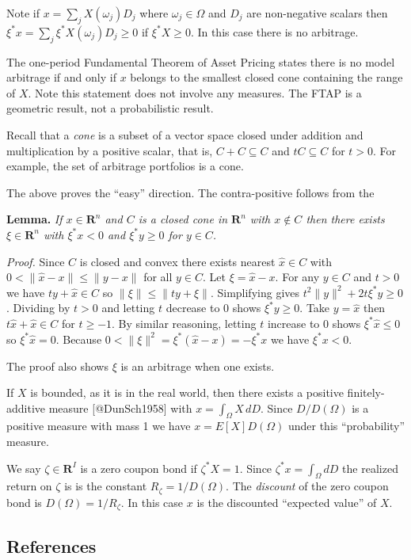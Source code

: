 Note if \(x = \sum_j X(\omega_j) D_j\) where \(\omega_j\in\Omega\) and
\(D_j\) are non-negative scalars then
\({\xi^*x = \sum_j \xi^*X(\omega_j) D_j \ge 0}\) if \(\xi^*X\ge0\). In
this case there is no arbitrage.

The one-period Fundamental Theorem of Asset Pricing states there is no
model arbitrage if and only if \(x\) belongs to the smallest closed cone
containing the range of \(X\). Note this statement does not involve any
measures. The FTAP is a geometric result, not a probabilistic result.

Recall that a \emph{cone} is a subset of a vector space closed under
addition and multiplication by a positive scalar, that is,
\(C + C\subseteq C\) and \(tC\subseteq C\) for \(t > 0\). For example,
the set of arbitrage portfolios is a cone.

The above proves the ``easy'' direction. The contra-positive follows
from the

\textbf{Lemma.} \emph{If \(x\in\mathbf{R}^n\) and \(C\) is a closed cone
in \(\mathbf{R}^n\) with \(x\not\in C\) then there exists
\(\xi\in\mathbf{R}^n\) with \(\xi^* x < 0\) and \(\xi^* y \ge0\) for
\(y\in C\).}

\emph{Proof.} Since \(C\) is closed and convex there exists nearest
\(\hat{x}\in C\) with \(0 < \|\hat{x} - x\| \le \|y - x\|\) for all
\(y\in C\). Let \(\xi = \hat{x} - x\). For any \(y\in C\) and \(t > 0\)
we have \(ty + \hat{x}\in C\) so \(\|\xi\| \le \|ty + \xi\|\).
Simplifying gives \(t^2\|y\|^2 + 2t\xi^* y\ge 0\). Dividing by \(t > 0\)
and letting \(t\) decrease to 0 shows \(\xi^* y\ge 0\). Take
\(y = \hat{x}\) then \(t\hat{x} + \hat{x}\in C\) for \(t \ge -1\). By
similar reasoning, letting \(t\) increase to 0 shows
\(\xi^* \hat{x}\le 0\) so \(\xi^* \hat{x} = 0\). Because
\(0 < \|\xi\|^2 = \xi^* (\hat{x} - x) = -\xi^* x\) we have
\(\xi^* x < 0\).

The proof also shows \(\xi\) is an arbitrage when one exists.

If \(X\) is bounded, as it is in the real world, then there exists a
positive finitely-additive measure {[}@DunSch1958{]} with
\(x = \int_\Omega X\,dD\). Since \(D/D(\Omega)\) is a positive measure
with mass 1 we have \(x = E[X]D(\Omega)\) under this ``probability''
measure.

We say \(\zeta\in\mathbf{R}^I\) is a zero coupon bond if
\(\zeta^* X = 1\). Since \(\zeta^*x = \int_\Omega dD\) the realized
return on \(\zeta\) is is the constant \(R_\zeta = 1/D(\Omega)\). The
\emph{discount} of the zero coupon bond is \(D(\Omega) = 1/R_\zeta\). In
this case \(x\) is the discounted ``expected value'' of \(X\).

\subsection{References}\label{references}
